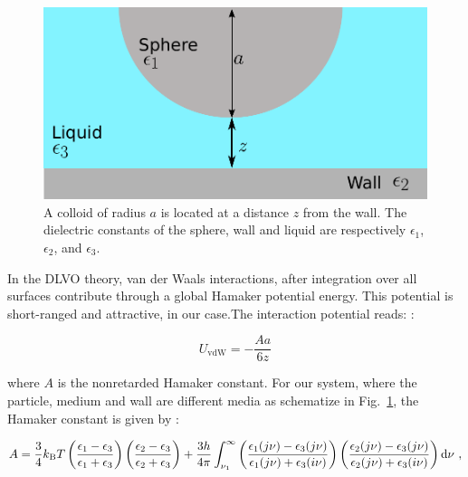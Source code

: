 \begin{figure}[h]
	\centering
	\includegraphics{02_body/chapter3/images/vdw_scheme.pdf}
	\caption{A colloid of radius $a$ is located at a distance $z$ from the wall. The dielectric constants of the sphere, wall and liquid are respectively $\epsilon_1$, $\epsilon_2$, and $\epsilon_3$. }
	\label{Fig:vdw}
\end{figure}

In the DLVO theory, van der Waals interactions, after integration over all surfaces contribute through a global Hamaker potential energy. This potential is short-ranged and attractive, in our case.The interaction potential reads: \cite{israelachvili_intermolecular_2015}:

\begin{equation}
	U_\mathrm{vdW} = -\frac{A a}{6z} 
\end{equation}

where $A$ is the nonretarded Hamaker constant. For our system, where the particle, medium and wall are different media as schematize in Fig.~\ref{Fig:vdw}, the Hamaker constant is given by \cite{israelachvili_intermolecular_2015}:

\begin{equation}
	A = \frac{3}{4} k_\mathrm{B}T \left(
	\frac{\epsilon_1 - \epsilon_3}{\epsilon_1 + \epsilon_3}
	\right)
	\left(
	\frac{\epsilon_2 - \epsilon_3}{\epsilon_2 + \epsilon_3}
	\right)
	+
	\frac{3h}{4\pi}
	\int_{\nu_1}^{\infty}
	\left(
	\frac{\epsilon_1 (j\nu) - \epsilon_3 (j\nu)}{\epsilon_1 (j\nu) + \epsilon_3 (i\nu)}
	\right)
	\left(
	\frac{\epsilon_2 (j\nu) - \epsilon_3 (j\nu)}{\epsilon_2 (j\nu) + \epsilon_3 (i\nu)}
	\right)
	\textnormal{d}\nu ~,
\end{equation}

